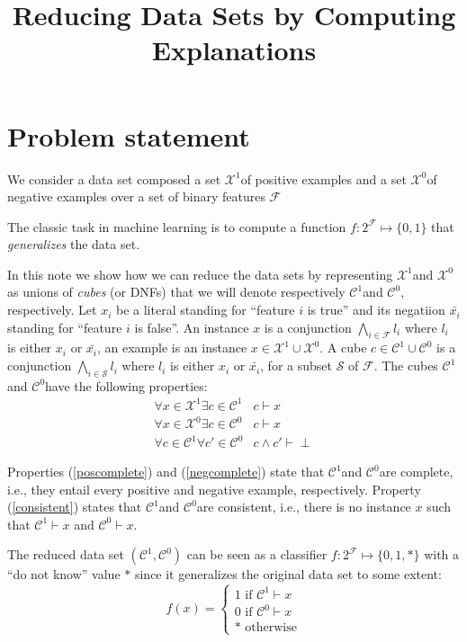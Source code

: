 \documentclass{article}
\title{Reducing Data Sets by Computing Explanations}
\newcommand{\setex}[1]{\ensuremath{{\mathcal X}^{#1}}\xspace}
\newcommand{\posex}{{\setex{1}}}
\newcommand{\negex}{{\setex{0}}}
\newcommand{\setcube}[1]{\ensuremath{{\mathcal C}^{#1}}\xspace}
\newcommand{\poscube}{\ensuremath{\setcube{1}}}
\newcommand{\negcube}{\ensuremath{\setcube{0}}}
\newcommand{\features}{\ensuremath{{\mathcal F}}\xspace}
\newcommand{\classifier}{\ensuremath{f}}
\newcommand{\lit}[1]{\ensuremath{l_{#1}}}
\newcommand{\var}{\ensuremath{x}}
\newcommand{\truelit}[1]{\ensuremath{\var_{#1}}}
\newcommand{\falselit}[1]{\ensuremath{\bar{\var_{#1}}}}
\newcommand{\ex}{\ensuremath{\var}}
\newcommand{\cube}{\ensuremath{c}}
\begin{document}
\maketitle

\section*{Problem statement}

We consider a data set composed a set \posex of positive examples and a set \negex of negative examples over a set of binary features $\features$

The classic task in machine learning is to compute a function $\classifier : 2^{\features} \mapsto \{0,1\}$ that \emph{generalizes} the data set.

In this note we show how we can reduce the data sets by representing \posex and \negex as unions of \emph{cubes} (or DNFs) that we will denote respectively \poscube and \negcube, respectively. Let $\truelit{i}$ be a literal standing for ``feature $i$ is true'' and its negatiion $\falselit{i}$ standing for ``feature $i$ is false''. An instance $\ex$ is a conjunction $\bigwedge_{i \in \features}\lit{i}$ where $\lit{i}$ is either $\truelit{i}$ or $\falselit{i}$, an example is an instance $\ex \in \posex \cup \negex$.
A cube $\cube \in \poscube \cup \negcube$ is a conjunction $\bigwedge_{i \in {\mathcal S}}\lit{i}$ where $\lit{i}$ is either $\truelit{i}$ or $\falselit{i}$, for a subset ${\mathcal S}$ of \features.
The cubes \poscube and \negcube have the following properties:
\begin{eqnarray}
	\forall \ex \in \posex \exists \cube \in \poscube & \cube \vdash \ex \label{poscomplete} \\
	\forall \ex \in \negex \exists \cube \in \negcube & \cube \vdash \ex \label{negcomplete} \\
	\forall \cube \in \poscube  \forall \cube' \in \negcube  & \cube \wedge \cube' \vdash \perp \label{consistent}
\end{eqnarray}

Properties (\ref{poscomplete}) and (\ref{negcomplete}) state that \poscube and \negcube are complete, i.e., they entail every positive and negative example, respectively. Property (\ref{consistent}) states that \poscube and \negcube are consistent, i.e., there is no instance $\ex$ such that $\poscube \vdash \ex$ and $\negcube \vdash \ex$.

 The reduced data set $(\poscube,\negcube)$ can be seen as a classifier $\classifier : 2^{\features} \mapsto \{0,1,*\}$ with a ``do not know'' value $*$ since it generalizes the original data set to some extent:
 $$
 \classifier(\ex) = \begin{cases} 1 \textrm{~if~} \poscube \vdash \ex\\ 0 \textrm{~if~} \negcube \vdash \ex\\ * \textrm{~otherwise} \end{cases}
 $$
 
\end{document}
